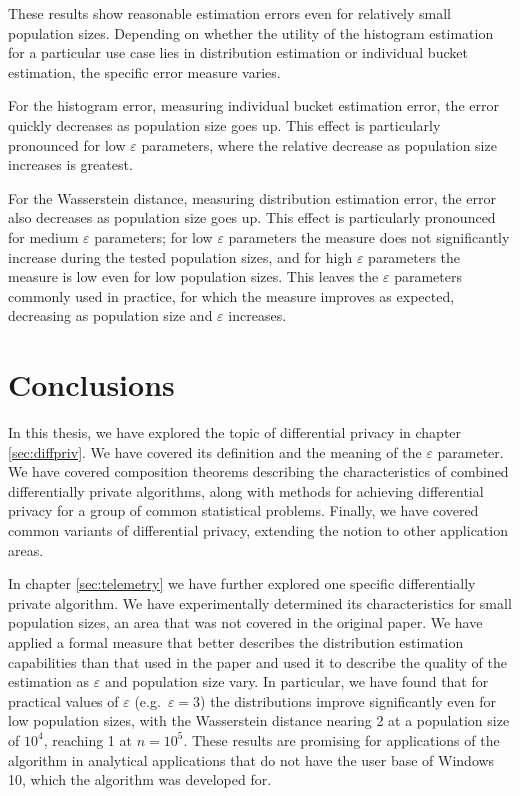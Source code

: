 \documentclass[a4paper,12pt]{article}
\renewcommand{\epsilon}{\varepsilon}
\begin{document}
These results show reasonable estimation errors even for relatively small population sizes. Depending on whether the utility of the histogram estimation for a particular use case lies in distribution estimation or individual bucket estimation, the specific error measure varies.

For the histogram error, measuring individual bucket estimation error, the error quickly decreases as population size goes up. This effect is particularly pronounced for low $\epsilon$ parameters, where the relative decrease as population size increases is greatest.

For the Wasserstein distance, measuring distribution estimation error, the error also decreases as population size goes up. This effect is particularly pronounced for medium $\epsilon$ parameters; for low $\epsilon$ parameters the measure does not significantly increase during the tested population sizes, and for high $\epsilon$ parameters the measure is low even for low population sizes. This leaves the $\epsilon$ parameters commonly used in practice, for which the measure improves as expected, decreasing as population size and $\epsilon$ increases.

\newpage
\section{Conclusions}

In this thesis, we have explored the topic of differential privacy in chapter \ref{sec:diffpriv}. We have covered its definition and the meaning of the $\epsilon$ parameter. We have covered composition theorems describing the characteristics of combined differentially private algorithms, along with methods for achieving differential privacy for a group of common statistical problems. Finally, we have covered common variants of differential privacy, extending the notion to other application areas.

In chapter \ref{sec:telemetry} we have further explored one specific differentially private algorithm. We have experimentally determined its characteristics for small population sizes, an area that was not covered in the original paper. We have applied a formal measure that better describes the distribution estimation capabilities than that used in the paper and used it to describe the quality of the estimation as $\epsilon$ and population size vary. In particular, we have found that for practical values of $\epsilon$ (e.g.\ $\epsilon = 3$) the distributions improve significantly even for low population sizes, with the Wasserstein distance nearing 2 at a population size of $10^4$, reaching 1 at $n=10^5$. These results are promising for applications of the algorithm in analytical applications that do not have the user base of Windows 10, which the algorithm was developed for.
\end{document}
